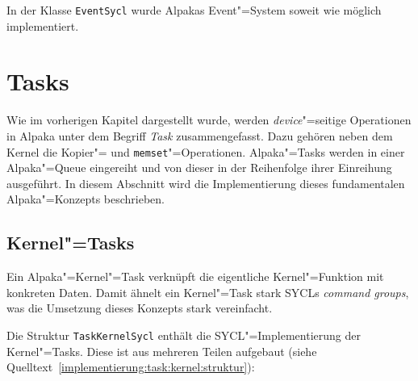 In der Klasse \texttt{EventSycl} wurde Alpakas Event"=System soweit wie möglich
implementiert.

\section{Tasks}
\label{implementierung:task}

Wie im vorherigen Kapitel dargestellt wurde, werden \textit{device}"=seitige
Operationen in Alpaka unter dem Begriff \textit{Task} zusammengefasst. Dazu
gehören neben dem Kernel die Kopier"= und \texttt{memset}"=Operationen.
Alpaka"=Tasks werden in einer Alpaka"=Queue eingereiht und von dieser in der
Reihenfolge ihrer Einreihung ausgeführt. In diesem Abschnitt wird die
Implementierung dieses fundamentalen Alpaka"=Konzepts beschrieben.

\subsection{Kernel"=Tasks}
\label{implementierung:task:kernel}

Ein Alpaka"=Kernel"=Task verknüpft die eigentliche Kernel"=Funktion mit
konkreten Daten. Damit ähnelt ein Kernel"=Task stark SYCLs
\textit{command groups}, was die Umsetzung dieses Konzepts stark vereinfacht.

Die Struktur \texttt{TaskKernelSycl} enthält die SYCL"=Implementierung der
Kernel"=Tasks. Diese ist aus mehreren Teilen aufgebaut (siehe
Quelltext~\ref{implementierung:task:kernel:struktur}):

